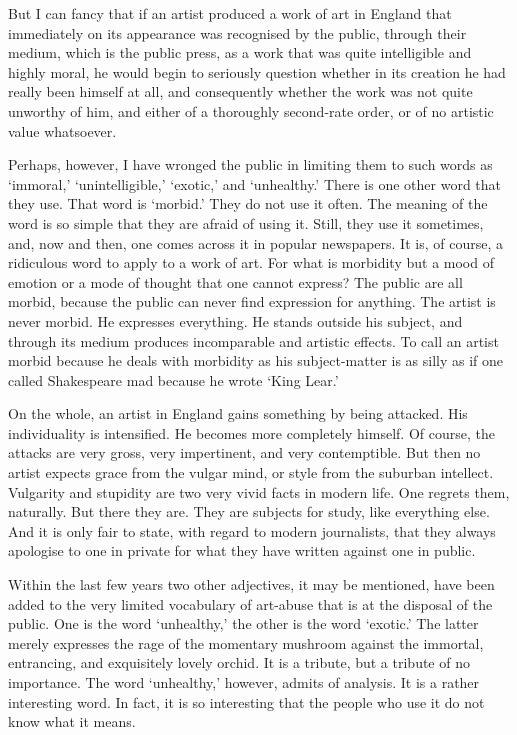 But I can fancy that if an artist produced a work of art in England that immediately on its appearance was recognised by the public, through their medium, which is the public press, as a work that was quite intelligible and highly moral, he would begin to seriously question whether in its creation he had really been himself at all, and consequently whether the work was not quite unworthy of him, and either of a thoroughly second-rate order, or of no artistic value whatsoever.\par

Perhaps, however, I have wronged the public in limiting them to such words as ‘immoral,’ ‘unintelligible,’ ‘exotic,’ and ‘unhealthy.’ There is one other word that they use. That word is ‘morbid.’ They do not use it often. The meaning of the word is so simple that they are afraid of using it. Still, they use it sometimes, and, now and then, one comes across it in popular newspapers. It is, of course, a ridiculous word to apply to a work of art. For what is morbidity but a mood of emotion or a mode of thought that one cannot express? The public are all morbid, because the public can never find expression for anything. The artist is never morbid. He expresses everything. He stands outside his subject, and through its medium produces incomparable and artistic effects. To call an artist morbid because he deals with morbidity as his subject-matter is as silly as if one called Shakespeare mad because he wrote ‘King Lear.’\par

On the whole, an artist in England gains something by being attacked. His individuality is intensified. He becomes more completely himself. Of course, the attacks are very gross, very impertinent, and very contemptible. But then no artist expects grace from the vulgar mind, or style from the suburban intellect. Vulgarity and stupidity are two very vivid facts in modern life. One regrets them, naturally. But there they are. They are subjects for study, like everything else. And it is only fair to state, with regard to modern journalists, that they always apologise to one in private for what they have written against one in public.\par

Within the last few years two other adjectives, it may be mentioned, have been added to the very limited vocabulary of art-abuse that is at the disposal of the public. One is the word ‘unhealthy,’ the other is the word ‘exotic.’ The latter merely expresses the rage of the momentary mushroom against the immortal, entrancing, and exquisitely lovely orchid. It is a tribute, but a tribute of no importance. The word ‘unhealthy,’ however, admits of analysis. It is a rather interesting word. In fact, it is so interesting that the people who use it do not know what it means.\par

